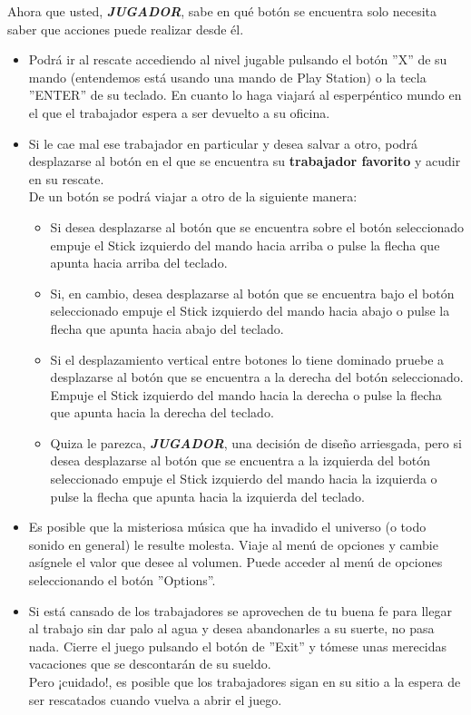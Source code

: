Ahora que usted,  \textit{\textbf{JUGADOR}}, sabe en qué botón se encuentra solo necesita saber que acciones puede realizar desde él.
\begin{itemize}
\item
Podrá ir al rescate accediendo al nivel jugable pulsando el botón ''X'' de su mando (entendemos está usando una mando de Play Station) o la tecla ''ENTER'' de su teclado. En cuanto lo haga viajará al \textcolor{endeavour}{esperpéntico mundo} en el que el \textcolor{azulWorker}{trabajador} espera a ser devuelto a su oficina.
\item
Si le cae mal ese \textcolor{azulWorker}{trabajador} en particular y desea salvar a otro, podrá desplazarse al botón en el que se encuentra su \textcolor{azulWorker}{\textbf{trabajador favorito}} y acudir en su rescate.\\
De un botón se podrá viajar a otro de la siguiente manera:
\begin{itemize}
\item
Si desea desplazarse al botón que se encuentra sobre el botón seleccionado empuje el Stick izquierdo del mando hacia arriba o pulse la flecha que apunta hacia arriba del teclado.
\item
Si, en cambio, desea desplazarse al botón que se encuentra bajo el botón seleccionado empuje el Stick izquierdo del mando hacia abajo o pulse la flecha que apunta hacia abajo del teclado.
\item
Si el desplazamiento vertical entre botones lo tiene dominado pruebe a  desplazarse al botón que se encuentra a la derecha del botón seleccionado. Empuje el Stick izquierdo del mando hacia la derecha o pulse la flecha que apunta hacia la derecha del teclado.
\item
Quiza le parezca, \textit{\textbf{JUGADOR}}, una decisión de diseño arriesgada, pero si desea desplazarse al botón que se encuentra a la izquierda del botón seleccionado empuje el Stick izquierdo del mando hacia la izquierda o pulse la flecha que apunta hacia la izquierda del teclado.
\end{itemize}
\item
Es posible que la misteriosa música que ha invadido el universo (o todo sonido en general) le resulte molesta. Viaje al menú de opciones y cambie asígnele el valor que desee al volumen. Puede acceder al menú de opciones seleccionando el botón ''Options''.
\item
Si está cansado de los \textcolor{azulWorker}{trabajadores} se aprovechen de tu buena fe para llegar al trabajo sin dar palo al agua y desea abandonarles a su suerte, no pasa nada. Cierre el juego pulsando el botón de ''Exit'' y tómese unas merecidas vacaciones que se descontarán de su sueldo.\\
Pero ¡cuidado!, es posible que los \textcolor{azulWorker}{trabajadores} sigan en su sitio a la espera de ser rescatados cuando vuelva a abrir el juego.
\end{itemize}

